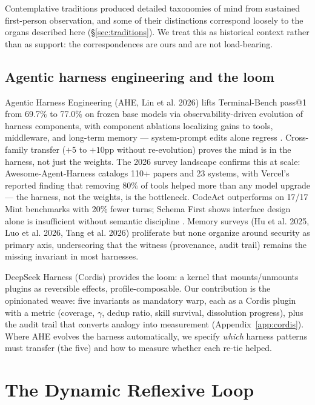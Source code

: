 \documentclass[11pt]{article}
\begin{document}
Contemplative traditions produced detailed taxonomies of mind from sustained first-person observation, and some of their distinctions correspond loosely to the organs described here (\S\ref{sec:traditions}). We treat this as historical context rather than as support: the correspondences are ours and are not load-bearing.

\subsection{Agentic harness engineering and the loom}

Agentic Harness Engineering (AHE, Lin et al. 2026) lifts Terminal-Bench pass@1 from 69.7\% to 77.0\% on frozen base models via observability-driven evolution of harness components, with component ablations localizing gains to tools, middleware, and long-term memory --- system-prompt edits alone regress \citep{lin2026ahe}. Cross-family transfer ($+5$ to $+10$pp without re-evolution) proves the mind is in the harness, not just the weights. The 2026 survey landscape confirms this at scale: Awesome-Agent-Harness catalogs 110+ papers and 23 systems, with Vercel's reported finding that removing 80\% of tools helped more than any model upgrade --- the harness, not the weights, is the bottleneck. CodeAct outperforms on 17/17 Mint benchmarks with 20\% fewer turns; Schema First shows interface design alone is insufficient without semantic discipline \citep{lin2026ahe}. Memory surveys (Hu et al. 2025, Luo et al. 2026, Tang et al. 2026) proliferate but none organize around security as primary axis, underscoring that the witness (provenance, audit trail) remains the missing invariant in most harnesses.

DeepSeek Harness (Cordis) provides the loom: a kernel that mounts/unmounts plugins as reversible effects, profile-composable. Our contribution is the opinionated weave: five invariants as mandatory warp, each as a Cordis plugin with a metric (coverage, $\gamma$, dedup ratio, skill survival, dissolution progress), plus the audit trail that converts analogy into measurement (Appendix~\ref{app:cordis}). Where AHE evolves the harness automatically, we specify \emph{which} harness patterns must transfer (the five) and how to measure whether each re-tie helped.

\section{The Dynamic Reflexive Loop}
\label{sec:loop}
\end{document}
